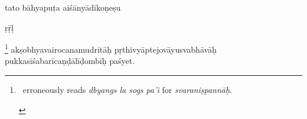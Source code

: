 \documentclass[naipra.tex]{subfiles}
\begin{document}
\begin{sanskrit}


\pstart
tato bāhyapuṭa aiśānyādikoṇeṣu \begin{mantra}\dsh ṛ\dsh ṝ\dsh ḷ\end{mantra}\dsh {}\footnote{
	\begin{english}%
		\TIB\ erroneously reads \emph{dbyangs la sogs pa'i} for \emph{svaraniṣpannāḥ}. 
	\end{english}
} akṣobhyavairocanamudritāḥ pṛthivyāptejovāyusvabhāvāḥ pukkasīśabarīcaṇḍālīḍombīḥ paśyet. 
\pend



\end{sanskrit}
\end{document}
